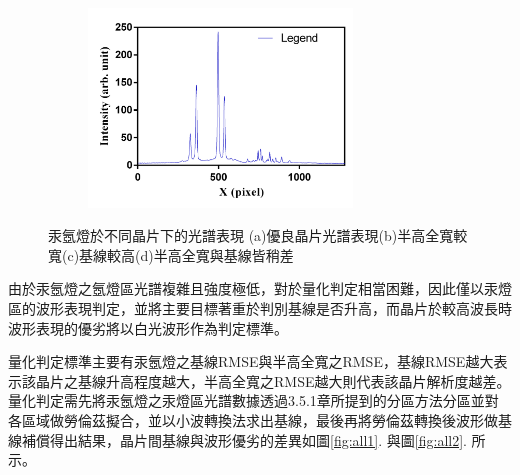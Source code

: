 \begin{figure}[H]
\begin{subfigure}[fig b]{0.49\textwidth}
	\setlength{\abovecaptionskip}{0.cm}
	\includegraphics[width=7cm]{figures/hg_ar_4.png}
	\caption{}
	\label{fig:d}
\end{subfigure}
\caption[汞氬燈於不同晶片的光譜表現]{汞氬燈於不同晶片下的光譜表現 (a)優良晶片光譜表現(b)半高全寬較寬(c)基線較高(d)半高全寬與基線皆稍差}
\label{fig:all}
\end{figure} 
由於汞氬燈之氬燈區光譜複雜且強度極低，對於量化判定相當困難，因此僅以汞燈區的波形表現判定，並將主要目標著重於判別基線是否升高，而晶片於較高波長時波形表現的優劣將以白光波形作為判定標準。\par
量化判定標準主要有汞氬燈之基線RMSE與半高全寬之RMSE，基線RMSE越大表示該晶片之基線升高程度越大，半高全寬之RMSE越大則代表該晶片解析度越差。量化判定需先將汞氬燈之汞燈區光譜數據透過3.5.1章所提到的分區方法分區並對各區域做勞倫茲擬合，並以小波轉換法求出基線，最後再將勞倫茲轉換後波形做基線補償得出結果，晶片間基線與波形優劣的差異如圖\ref{fig:all1}. 與圖\ref{fig:all2}. 所示。
